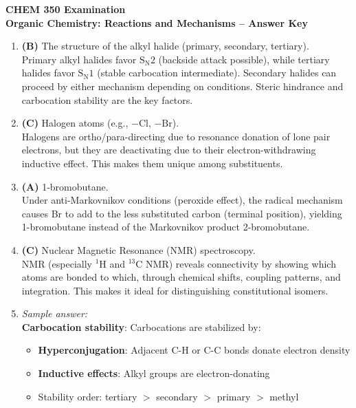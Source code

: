 \documentclass[11pt]{article}
\begin{document}
\begin{center}
  {\Large \textbf{CHEM 350 Examination}}\\[0.25em]
  {\large \textbf{Organic Chemistry: Reactions and Mechanisms -- Answer Key}}\\[0.5em]
\end{center}

\begin{enumerate}[label=\textbf{\arabic*.}]

  \item \textbf{(B)} The structure of the alkyl halide (primary, secondary, tertiary).\\
  Primary alkyl halides favor $\mathrm{S_N2}$ (backside attack possible), while tertiary halides 
  favor $\mathrm{S_N1}$ (stable carbocation intermediate). Secondary halides can proceed by either 
  mechanism depending on conditions. Steric hindrance and carbocation stability are the key factors.

  \item \textbf{(C)} Halogen atoms (e.g., $-\mathrm{Cl}$, $-\mathrm{Br}$).\\
  Halogens are ortho/para-directing due to resonance donation of lone pair electrons, but they are 
  deactivating due to their electron-withdrawing inductive effect. This makes them unique among 
  substituents.

  \item \textbf{(A)} 1-bromobutane.\\
  Under anti-Markovnikov conditions (peroxide effect), the radical mechanism causes Br to add to 
  the less substituted carbon (terminal position), yielding 1-bromobutane instead of the Markovnikov 
  product 2-bromobutane.

  \item \textbf{(C)} Nuclear Magnetic Resonance (NMR) spectroscopy.\\
  NMR (especially $^1$H and $^{13}$C NMR) reveals connectivity by showing which atoms are bonded 
  to which, through chemical shifts, coupling patterns, and integration. This makes it ideal for 
  distinguishing constitutional isomers.

  \item \emph{Sample answer:}\\
  \textbf{Carbocation stability}: Carbocations are stabilized by:
  \begin{itemize}
    \item \textbf{Hyperconjugation}: Adjacent C-H or C-C bonds donate electron density
    \item \textbf{Inductive effects}: Alkyl groups are electron-donating
    \item Stability order: tertiary $>$ secondary $>$ primary $>$ methyl
  \end{itemize}


\end{enumerate}
\end{document}
